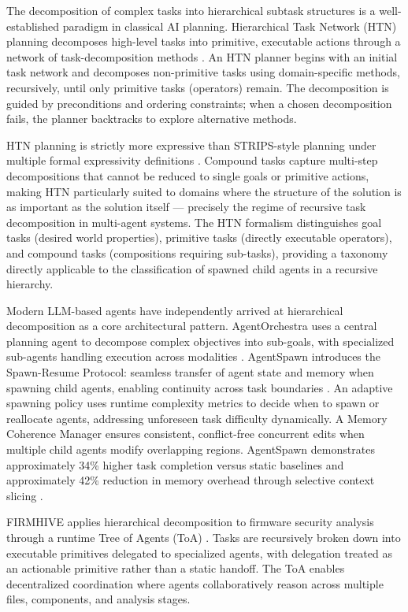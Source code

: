 The decomposition of complex tasks into hierarchical subtask structures is a well-established paradigm in classical AI planning. Hierarchical Task Network (HTN) planning decomposes high-level tasks into primitive, executable actions through a network of task-decomposition methods \cite{erol1994umcp, erol1996complexity, htn-survey2015}. An HTN planner begins with an initial task network and decomposes non-primitive tasks using domain-specific methods, recursively, until only primitive tasks (operators) remain. The decomposition is guided by preconditions and ordering constraints; when a chosen decomposition fails, the planner backtracks to explore alternative methods.

HTN planning is strictly more expressive than STRIPS-style planning under multiple formal expressivity definitions \cite{erol1994umcp}. Compound tasks capture multi-step decompositions that cannot be reduced to single goals or primitive actions, making HTN particularly suited to domains where the structure of the solution is as important as the solution itself --- precisely the regime of recursive task decomposition in multi-agent systems. The HTN formalism distinguishes goal tasks (desired world properties), primitive tasks (directly executable operators), and compound tasks (compositions requiring sub-tasks), providing a taxonomy directly applicable to the classification of spawned child agents in a recursive hierarchy.

Modern LLM-based agents have independently arrived at hierarchical decomposition as a core architectural pattern. AgentOrchestra uses a central planning agent to decompose complex objectives into sub-goals, with specialized sub-agents handling execution across modalities \cite{agentorchestra2025}. AgentSpawn introduces the Spawn-Resume Protocol: seamless transfer of agent state and memory when spawning child agents, enabling continuity across task boundaries \cite{agentspawn2025}. An adaptive spawning policy uses runtime complexity metrics to decide when to spawn or reallocate agents, addressing unforeseen task difficulty dynamically. A Memory Coherence Manager ensures consistent, conflict-free concurrent edits when multiple child agents modify overlapping regions. AgentSpawn demonstrates approximately 34\% higher task completion versus static baselines and approximately 42\% reduction in memory overhead through selective context slicing \cite{agentspawn2025}.

FIRMHIVE applies hierarchical decomposition to firmware security analysis through a runtime Tree of Agents (ToA) \cite{firmhive2025}. Tasks are recursively broken down into executable primitives delegated to specialized agents, with delegation treated as an actionable primitive rather than a static handoff. The ToA enables decentralized coordination where agents collaboratively reason across multiple files, components, and analysis stages.

